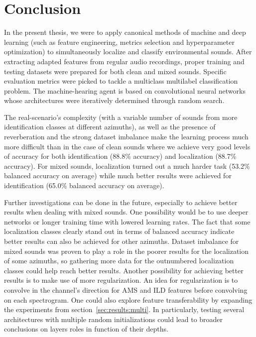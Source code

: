 \chapter{Conclusion}
\label{sec:conclusion}

In the present thesis, we were to apply canonical methods of machine and deep learning (such as feature engineering, metrics selection and hyperparameter optimization) to simultaneously localize and classify environmental sounds. After extracting adapted features from regular audio recordings, proper training and testing datasets were prepared for both clean and mixed sounds. Specific evaluation metrics were picked to tackle a multiclass multilabel classification problem. The machine-hearing agent is based on convolutional neural networks whose architectures were iteratively determined through random search.

The real-scenario's complexity (with a variable number of sounds from more identification classes at different azimuths), as well as the presence of reverberation and the strong dataset imbalance make the learning process much more difficult than in the case of clean sounds where we achieve very good levels of accuracy for both identification (88.8\% accuracy) and localization (88.7\% accuracy). For mixed sounds, localization turned out a much harder task (53.2\% balanced accuracy on average) while much better results were achieved for identification (65.0\% balanced accuracy on average).

Further investigations can be done in the future, especially to achieve better results when dealing with mixed sounds. One possibility would be to use deeper networks or longer training time with lowered learning rates. The fact that some localization classes clearly stand out in terms of balanced accuracy indicate better results can also be achieved for other azimuths. Dataset imbalance for mixed sounds was proven to play a role in the poorer results for the localization of some azimuths, so gathering more data for the outnumbered localization classes could help reach better results. Another possibility for achieving better results is to make use of more regularization. An idea for regularization is to convolve in the channel's direction for AMS and ILD features before convolving on each spectrogram.
One could also explore feature transferability by expanding the experiments from section~\ref{sec:results:multi}. In particularly, testing several architectures with multiple random initializations could lead to broader conclusions on layers roles in function of their depths.